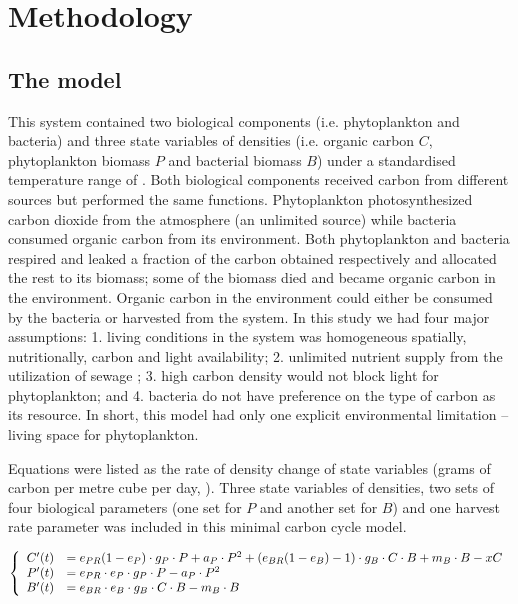 \documentclass[../thesis.tex]{subfiles} %
\begin{document}
\section{Methodology}

\subsection{The model}

This system contained two biological components (i.e. phytoplankton and bacteria) and three state variables of densities (i.e. organic carbon $C$, phytoplankton biomass $P$ and bacterial biomass $B$) under a standardised temperature range of \temp.  Both biological components received carbon from different sources but performed the same functions. Phytoplankton photosynthesized carbon dioxide from the atmosphere (an unlimited source) while bacteria consumed organic carbon from its environment.  Both phytoplankton and bacteria respired and leaked a fraction of the carbon obtained respectively and allocated the rest to its biomass; some of the biomass died and became organic carbon in the environment.  Organic carbon in the environment could either be consumed by the bacteria or harvested from the system.  In this study we had four major assumptions: 1. living conditions in the system was homogeneous spatially, nutritionally, carbon and light availability; 2. unlimited nutrient supply from the utilization of sewage \autocite{markou2014microalgal}; 3. high carbon density would not block light for phytoplankton; and 4. bacteria do not have preference on the type of carbon as its resource.  In short, this model had only one explicit environmental limitation -- living space for phytoplankton.

Equations were listed as the rate of density change of state variables (grams of carbon per metre cube per day, \dxdt).  Three state variables of densities, two sets of four biological parameters (one set for $P$ and another set for $B$) and one harvest rate parameter was included in this minimal carbon cycle model.

\begin{equation}\left\{\begin{array}{rl}
    C'(t) &= e_{PR}(1-e_P)\cdot g_P\cdot P +a_P\cdot P^2 +(e_{BR}(1-e_B)-1)\cdot g_B\cdot C\cdot B +m_B\cdot B -xC\\
    P'(t) &= e_{PR}\cdot e_P\cdot g_P\cdot P -a_P\cdot P^2\\
    B'(t) &= e_{BR}\cdot e_B\cdot g_B\cdot C\cdot B -m_B\cdot B
\end{array}\right.\label{eq:PBH}\end{equation}
\end{document}
